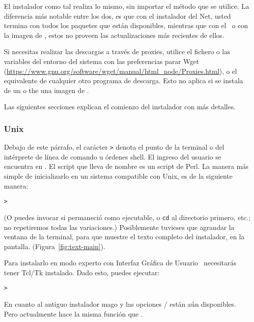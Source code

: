 \documentclass{article}
\begin{document}
El instalador como tal realiza lo mismo, sin importar el método que
se utilice. La diferencia más notable entre los dos, es que con el
instalador del Net, usted termina con todos los paquetes que están
disponibles, mientras que con el \DVD\ o con la imagen de
\ISO, estos no proveen las actualizaciones más recientes de
ellos.

Si necesitas realizar las descargas a través de proxies,
utilice el fichero  o las variables
del entorno del sistema con las preferencias parar Wget
(\url{https://www.gnu.org/software/wget/manual/html_node/Proxies.html}),
o el equivalente de cualquier otro programa de descarga. Esto no
aplica si se instala de un \DVD o the una imagen de \ISO.

\noindent
Las siguientes secciones explican el comienzo del instalador con más
detalles.

\subsubsection{Unix}

Debajo de este párrafo, el carácter \texttt{>} denota el
punto de la terminal o del intérprete de línea de comando u órdenes shell.
El ingreso del usuario se encuentra en
.  El script que lleva de nombre
 es un script de Perl. La manera más
simple de inicializarlo en un sistema compatible con Unix, es
de la siguiente manera: 

\begin{alltt} 
	>  
\end{alltt} 

(O puedes invocar  si
permaneció como ejecutable, o \texttt{cd} al directorio
primero, etc.; no repetiremos todas las variaciones.)
Posiblemente tuvieses que agrandar la ventana de la
terminal, para que muestre el texto completo del instalador,
en la pantalla.  (Figura~\ref{fig:text-main}).

Para instalarlo en modo experto con Interfaz Gráfica de
Usuario \GUI\, necesitarás tener Tcl/Tk instalado. Dado
esto, puedes ejecutar:
\begin{alltt}
	> 
\end{alltt}

En cuanto al antiguo instalador mago  y las opciones
/ están aún disponibles. Pero actualmente hace la misma función que .
\end{document}
